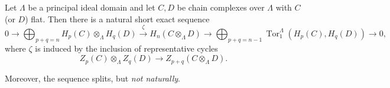 Let $\Lambda$ be a principal ideal domain and let $C, D$ be chain complexes over $\Lambda$ with $C$ (or $D$) flat. Then there is a natural short exact sequence
$$0 \rightarrow \bigoplus_{p+q=n} H_p(C) \otimes_{\Lambda} H_q(D) \xrightarrow{\zeta} H_n(C \otimes_{\Lambda} D) \rightarrow \bigoplus_{p+q=n-1} \operatorname{Tor}_1^{\Lambda}(H_p(C), H_q(D)) \rightarrow 0,$$
where $\zeta$ is induced by the inclusion of representative cycles
$$Z_p(C) \otimes_{\Lambda} Z_q(D) \rightarrow Z_{p+q}(C \otimes_{\Lambda} D).$$

Moreover, the sequence splits, but \emph{not naturally}.
